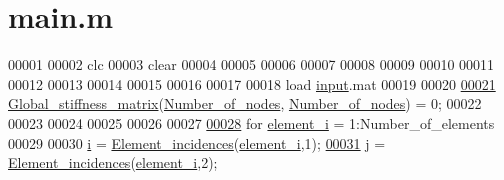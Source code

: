 \hypertarget{L01_2main_8m_source}{}\section{main.\+m}
\label{L01_2main_8m_source}

\begin{DoxyCode}
00001 %
00002 clc
00003 clear
00004 
00005 %
00006 
00007 %
00008 %
00009 %
00010 %
00011 %
00012 %
00013 %
00014 %
00015 %
00016 
00017 
00018 load \hyperlink{namespaceinput}{input}.mat
00019 
00020 %
\hypertarget{L01_2main_8m_source_l00021}{}\hyperlink{L01_2main_8m_a1d65c23ed4744bf98747671b08490b5c}{00021} \hyperlink{GeoTech_2BC_2main_8m_a31cdcce530a93925f9b8c6349e94e70b}{Global\_stiffness\_matrix}(\hyperlink{L01_2main_8m_a1d65c23ed4744bf98747671b08490b5c}{Number\_of\_nodes},
      \hyperlink{L01_2main_8m_a1d65c23ed4744bf98747671b08490b5c}{Number\_of\_nodes}) = 0;
00022 
00023 %
00024 
00025 %
00026 %
00027 
\hypertarget{L01_2main_8m_source_l00028}{}\hyperlink{L01_2main_8m_aeaaf98952d2cff93963f1287282861de}{00028} for \hyperlink{L01_2main_8m_aeaaf98952d2cff93963f1287282861de}{element\_i} = 1:Number\_of\_elements
00029     
00030     \hyperlink{DoS_201_2main_8m_a6dbbc96f4222af2f6c18c8e60f41726b}{i} = \hyperlink{L01_2main_8m_aba5eae545abb25c91b167b9fcdf95479}{Element\_incidences}(\hyperlink{L01_2main_8m_aeaaf98952d2cff93963f1287282861de}{element\_i},1);
\hypertarget{L01_2main_8m_source_l00031}{}\hyperlink{L01_2main_8m_abf2bc2545a4a5f5683d9ef3ed0d977e0}{00031}     \hyperlink{L01_2main_8m_abf2bc2545a4a5f5683d9ef3ed0d977e0}{j} = \hyperlink{L01_2main_8m_aba5eae545abb25c91b167b9fcdf95479}{Element\_incidences}(\hyperlink{L01_2main_8m_aeaaf98952d2cff93963f1287282861de}{element\_i},2);

\end{DoxyCode}
